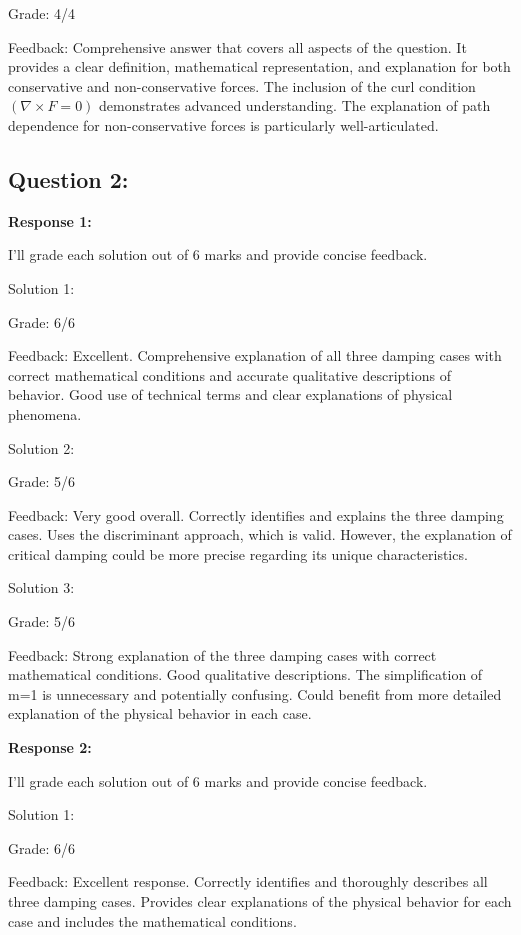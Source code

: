 \documentclass[a4paper,11pt]{article}
\begin{document}
Grade: 4/4

Feedback: Comprehensive answer that covers all aspects of the question. It provides a clear definition, mathematical representation, and explanation for both conservative and non-conservative forces. The inclusion of the curl condition \((\nabla \times F = 0)\) demonstrates advanced understanding. The explanation of path dependence for non-conservative forces is particularly well-articulated.

\subsection*{Question 2:}

\textbf{Response 1:}

I'll grade each solution out of 6 marks and provide concise feedback.

Solution 1:

Grade: 6/6

Feedback: Excellent. Comprehensive explanation of all three damping cases with correct mathematical conditions and accurate qualitative descriptions of behavior. Good use of technical terms and clear explanations of physical phenomena.

Solution 2:

Grade: 5/6

Feedback: Very good overall. Correctly identifies and explains the three damping cases. Uses the discriminant approach, which is valid. However, the explanation of critical damping could be more precise regarding its unique characteristics.

Solution 3:

Grade: 5/6

Feedback: Strong explanation of the three damping cases with correct mathematical conditions. Good qualitative descriptions. The simplification of m=1 is unnecessary and potentially confusing. Could benefit from more detailed explanation of the physical behavior in each case.

\bigskip    
\textbf{Response 2:}

I'll grade each solution out of 6 marks and provide concise feedback.

Solution 1:

Grade: 6/6

Feedback: Excellent response. Correctly identifies and thoroughly describes all three damping cases. Provides clear explanations of the physical behavior for each case and includes the mathematical conditions.
\end{document}
